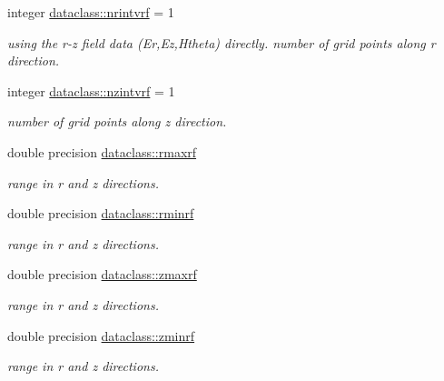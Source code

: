 \textbf{ }\par
\begin{DoxyCompactItemize}
\item 
integer \mbox{\hyperlink{namespacedataclass_a3b9a2feb5ab8139d532626cad00a9769}{dataclass\+::nrintvrf}} = 1
\begin{DoxyCompactList}\small\item\em using the r-\/z field data (Er,Ez,Htheta) directly. number of grid points along r direction. \end{DoxyCompactList}\item 
integer \mbox{\hyperlink{namespacedataclass_a7dee8b652907c73253c32891a2a08514}{dataclass\+::nzintvrf}} = 1
\begin{DoxyCompactList}\small\item\em number of grid points along z direction. \end{DoxyCompactList}\end{DoxyCompactItemize}

\textbf{ }\par
\begin{DoxyCompactItemize}
\item 
double precision \mbox{\hyperlink{namespacedataclass_a8ea08da279b20aa500095cba377a2de2}{dataclass\+::rmaxrf}}
\begin{DoxyCompactList}\small\item\em range in r and z directions. \end{DoxyCompactList}\item 
double precision \mbox{\hyperlink{namespacedataclass_aae1944e971e5c71db5d8f21afceb0935}{dataclass\+::rminrf}}
\begin{DoxyCompactList}\small\item\em range in r and z directions. \end{DoxyCompactList}\item 
double precision \mbox{\hyperlink{namespacedataclass_a4646788256b1b461413c546d6df8ee88}{dataclass\+::zmaxrf}}
\begin{DoxyCompactList}\small\item\em range in r and z directions. \end{DoxyCompactList}\item 
double precision \mbox{\hyperlink{namespacedataclass_a24985c63a3d2c04ccb2cf299eff0c626}{dataclass\+::zminrf}}
\begin{DoxyCompactList}\small\item\em range in r and z directions. \end{DoxyCompactList}\end{DoxyCompactItemize}

